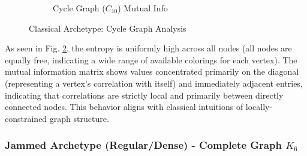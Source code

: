 \documentclass[12pt, letterpaper]{article}
\begin{document}
\begin{figure}[H]
\begin{subfigure}[b]{0.48\textwidth}
        \caption{Cycle Graph ($C_{10}$) Mutual Info}
        \label{fig:cycle_mi}
    \end{subfigure}
    \caption{Classical Archetype: Cycle Graph Analysis}
    \label{fig:cycle_analysis}
\end{figure}

As seen in Fig. \ref{fig:cycle_analysis}, the entropy is uniformly high across all nodes (all nodes are equally free, indicating a wide range of available colorings for each vertex). The mutual information matrix shows values concentrated primarily on the diagonal (representing a vertex's correlation with itself) and immediately adjacent entries, indicating that correlations are strictly local and primarily between directly connected nodes. This behavior aligns with classical intuitions of locally-constrained graph structure.

\subsubsection{Jammed Archetype (Regular/Dense) - Complete Graph $K_6$}
\end{document}
